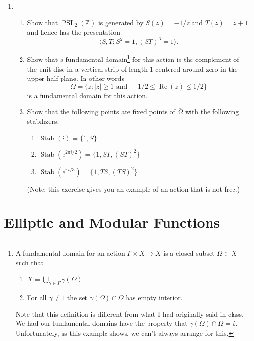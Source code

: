 \documentclass[a4paper,10pt]{article}
\newcommand{\ZZ}{\mathbb{Z}}
\newcommand{\PSL}{\operatorname{PSL}}
\newcommand{\Stab}{\operatorname{Stab}}
\renewcommand{\Re}{\operatorname{Re}}
\begin{document}
\begin{enumerate}
\item 
\begin{enumerate}
	
	\item Show that $\PSL_2(\ZZ)$ is generated by $S(z) = -1/z$ and $T(z) = z+1$ and hence has the presentation
	$$ \langle S, T : S^2 = 1, (ST)^3 = 1 \rangle. $$
	
	\item Show that a fundamental domain\footnote{A fundamental domain for an action $\Gamma \times X \to X$ is a closed subset $\Omega \subset X$ such that 
		\begin{enumerate}
			\item $X = \bigcup_{\gamma \in \Gamma} \gamma(\Omega)$
			\item For all $\gamma \neq 1$ the set $\gamma(\Omega) \cap \Omega$ has empty interior.
		\end{enumerate}
		Note that this definition is different from what I had originally said in class. We had our fundamental domains have the property that $\gamma(\Omega) \cap \Omega = \emptyset.$ Unfortunately, as this example shows, we can't always arrange for this.   
	} for this action is the complement of the unit disc in a vertical strip of length 1 centered around zero in the upper half plane. In other words
	$$ \Omega =  \lbrace z: \vert z \vert \geq 1 \mbox{ and } -1/2\leq \Re(z) \leq 1/2 \rbrace$$ is a fundamental domain for this action.  
	
	\item 
	Show that the following points are fixed points of $\overline{\Omega}$ with the following stabilizers:
	\begin{enumerate}
		\item $\Stab(i) = \lbrace 1, S\rbrace$
		\item $\Stab(e^{2\pi i/2}) = \lbrace 1, ST, (ST)^2 \rbrace $
		\item $\Stab(e^{\pi i/3}) = \lbrace 1, TS, (TS)^2 \rbrace $
	\end{enumerate}
	(Note: this exercise gives you an example of an action that is not free.)
\end{enumerate}

\end{enumerate}


\section{Elliptic and Modular Functions} 
\end{document}
